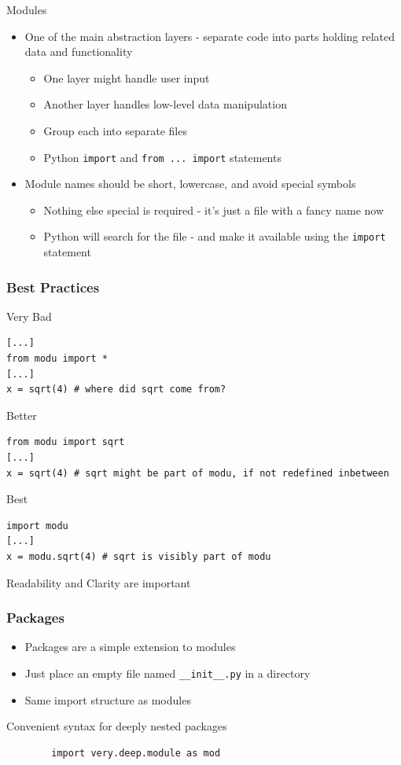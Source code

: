 \documentclass[11pt,professionalfonts]{beamer}
\begin{document}
\begin{frame}{Modules}
    \begin{itemize}
        \item One of the main abstraction layers - separate code into parts holding related data and functionality
            \begin{itemize}
                \item One layer might handle user input 
                \item Another layer handles low-level data manipulation
                \item Group each into separate files
                \item Python \texttt{import} and \texttt{from ... import} statements
            \end{itemize}
        \item Module names should be short, lowercase, and avoid special symbols
            \begin{itemize}
                \item Nothing else special is required - it's just a file with a fancy name now
                \item Python will search for the file - and make it available using the \texttt{import} statement
            \end{itemize}
    \end{itemize}


\end{frame}

\begin{frame}[fragile]\frametitle{Best Practices}
Very Bad
\begin{verbatim}
[...]
from modu import *
[...]
x = sqrt(4) # where did sqrt come from?
\end{verbatim}
\pause
Better
\begin{verbatim}
from modu import sqrt
[...]
x = sqrt(4) # sqrt might be part of modu, if not redefined inbetween
\end{verbatim}
\pause
Best
\begin{verbatim}
import modu
[...]
x = modu.sqrt(4) # sqrt is visibly part of modu
\end{verbatim}

\pause
\begin{alertblock}{}
    \centering
Readability and Clarity are important
\end{alertblock}
\end{frame}

\begin{frame}[fragile]\frametitle{Packages}
    \begin{itemize}
        \item Packages are a simple extension to modules
        \item Just place an empty file named \texttt{\_\_init\_\_.py} in a directory
        \item Same import structure as modules
    \end{itemize}

    Convenient syntax for deeply nested packages
    \begin{verbatim}
        import very.deep.module as mod
    \end{verbatim}
\end{frame}
\end{document}
